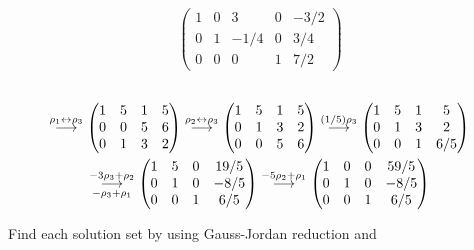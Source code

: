 \begin{exercises}
\begin{answer}
\begin{exparts}
\begin{multline*}
            \begin{pmatrix}
              1  &0  &3    &0  &-3/2  \\
              0  &1  &-1/4 &0  &3/4     \\
              0  &0  &0    &1  &7/2
            \end{pmatrix}
          \end{multline*}
        \partsitem \ \begin{multline*}
            \grstep{\rho_1\leftrightarrow\rho_3}
            \begin{pmatrix}
              1  &5  &1  &5  \\
              0  &0  &5  &6  \\
              0  &1  &3  &2
            \end{pmatrix}
            \grstep{\rho_2\leftrightarrow\rho_3}
            \begin{pmatrix}
              1  &5  &1  &5  \\
              0  &1  &3  &2  \\
              0  &0  &5  &6
            \end{pmatrix}                  
            \grstep{(1/5)\rho_3}
            \begin{pmatrix}
              1  &5  &1  &5  \\
              0  &1  &3  &2  \\
              0  &0  &1  &6/5
            \end{pmatrix}                  \\
            \grstep[-\rho_3+\rho_1]{-3\rho_3+\rho_2}
            \begin{pmatrix}
              1  &5  &0  &19/5  \\
              0  &1  &0  &-8/5  \\
              0  &0  &1  &6/5
            \end{pmatrix}                  
            \grstep{-5\rho_2+\rho_1}
            \begin{pmatrix}
              1  &0  &0  &59/5  \\
              0  &1  &0  &-8/5  \\
              0  &0  &1  &6/5
            \end{pmatrix}
          \end{multline*}
      \end{exparts}  
    \end{answer}
  \recommended \item 
    Find each solution set by using Gauss-Jordan reduction and

\end{exercises}
